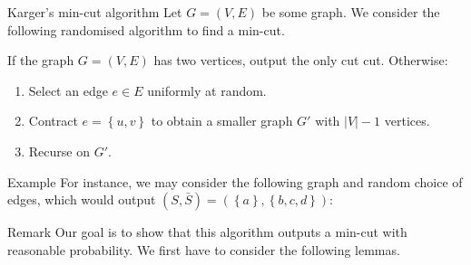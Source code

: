 \documentclass[a4paper]{article}
\begin{document}
\begin{parag}{Karger's min-cut algorithm}
    Let $G = \left(V, E\right)$ be some graph. We consider the following randomised algorithm to find a min-cut.

    If the graph $G = \left(V, E\right)$ has two vertices, output the only cut cut. Otherwise: 
    \begin{enumerate}
        \item Select an edge $e \in E$ uniformly at random.
        \item Contract $e = \left\{u, v\right\}$ to obtain a smaller graph $G'$ with $\left|V\right| - 1$ vertices.
        \item Recurse on $G'$.
    \end{enumerate}

    \begin{subparag}{Example}
        For instance, we may consider the following graph and random choice of edges, which would output $\left(S, \bar{S}\right) = \left(\left\{a\right\}, \left\{b, c, d\right\}\right)$:
    \end{subparag}

    \begin{subparag}{Remark}
        Our goal is to show that this algorithm outputs a min-cut with reasonable probability. We first have to consider the following lemmas.
    \end{subparag}
\end{parag}
\end{document}
